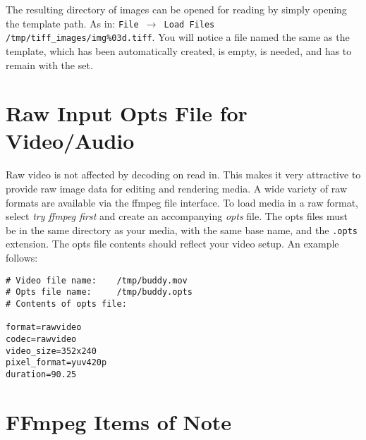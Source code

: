 The resulting directory of images can be opened for reading by simply opening the template path.  As in: \texttt{File $\rightarrow$ Load Files} \texttt{/tmp/tiff\_images/img\%03d.tiff}.  You will notice a file named the same as the template, which has been automatically created, is empty, is needed, and has to remain with the set.

\section{Raw Input Opts File for Video/Audio}%
\label{sec:raw_input_opts_video_audio}

Raw video is not affected by decoding on read in.  This makes it very attractive to provide raw image data for editing and rendering media.  A wide variety of raw formats are available via the ffmpeg file interface.  To load media in a raw format, select \textit{try ffmpeg first} and create an accompanying \textit{opts} file.  The opts files must be in the same directory as your media, with the same base name, and the \texttt{.opts} extension.  The opts file contents should reflect your video setup.  An example follows:

\begin{lstlisting}[style=sh]
# Video file name:    /tmp/buddy.mov
# Opts file name:     /tmp/buddy.opts
# Contents of opts file:

format=rawvideo
codec=rawvideo
video_size=352x240
pixel_format=yuv420p
duration=90.25
\end{lstlisting}

\section{FFmpeg Items of Note}%
\label{sec:ffmpeg_items_note}

